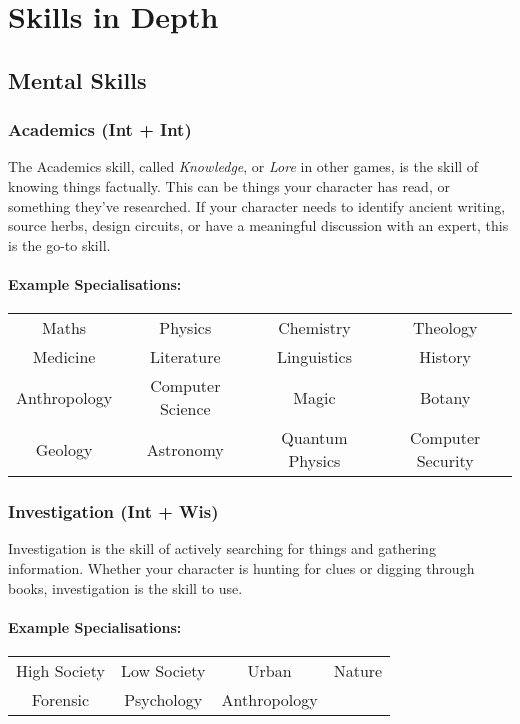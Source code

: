 \section{Skills in Depth}
\subsection{Mental Skills}
\subsubsection{Academics (Int + Int)}
The Academics skill, called \textit{Knowledge}, or \textit{Lore} in other games, is the skill of knowing things factually. 
This can be things your character has read, or something they've researched.
If your character needs to identify ancient writing, source herbs, design circuits, or have a meaningful discussion with an expert, this is the go-to skill.

\paragraph{Example Specialisations:}
\begin{center}
    \begin{tabular}{c|c|c|c}
        Maths & Physics & Chemistry & Theology \\
        Medicine & Literature & Linguistics & History \\
        Anthropology & Computer Science & Magic & Botany \\
        Geology & Astronomy & Quantum Physics & Computer Security \\
    \end{tabular}
\end{center}

\subsubsection{Investigation (Int + Wis)}
Investigation is the skill of actively searching for things and gathering information.
Whether your character is hunting for clues or digging through books, investigation is the skill to use.

\paragraph{Example Specialisations:}
\begin{center}
    \begin{tabular}{c|c|c|c}
        High Society & Low Society & Urban & Nature \\
        Forensic & Psychology & Anthropology  \\
    \end{tabular}
\end{center}


